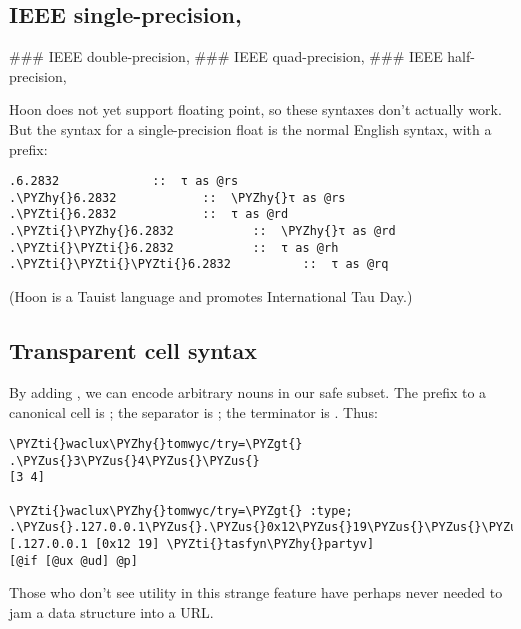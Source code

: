 \subsection{IEEE single-precision, }

\#\#\# IEEE double-precision, 
\#\#\# IEEE quad-precision, 
\#\#\# IEEE half-precision, 

Hoon does not yet support floating point, so these syntaxes
don't actually work.  But the syntax for a single-precision
float is the normal English syntax, with a  prefix:

\begin{framed_shaded}
\begin{Verbatim}[fontsize=\relsize{-2.5},fontseries=b,commandchars=\\\{\}]
.6.2832             ::  τ as @rs
.\PYZhy{}6.2832            ::  \PYZhy{}τ as @rs
.\PYZti{}6.2832            ::  τ as @rd
.\PYZti{}\PYZhy{}6.2832           ::  \PYZhy{}τ as @rd
.\PYZti{}\PYZti{}6.2832           ::  τ as @rh
.\PYZti{}\PYZti{}\PYZti{}6.2832          ::  τ as @rq
\end{Verbatim}
\end{framed_shaded}
(Hoon is a Tauist language and promotes International Tau Day.)

\subsection{Transparent cell syntax}

By adding \kode{\_}, we can encode arbitrary nouns in our safe subset.
The prefix to a canonical cell is ; the separator is \kode{\_};
the terminator is \kode{\_\_}.  Thus:

\begin{framed_shaded}
\begin{Verbatim}[fontsize=\relsize{-2.5},fontseries=b,commandchars=\\\{\}]
\PYZti{}waclux\PYZhy{}tomwyc/try=\PYZgt{} .\PYZus{}3\PYZus{}4\PYZus{}\PYZus{}
[3 4]

\PYZti{}waclux\PYZhy{}tomwyc/try=\PYZgt{} :type; .\PYZus{}.127.0.0.1\PYZus{}.\PYZus{}0x12\PYZus{}19\PYZus{}\PYZus{}\PYZus{}\PYZti{}tasfyn\PYZhy{}partyv\PYZus{}\PYZus{}
[.127.0.0.1 [0x12 19] \PYZti{}tasfyn\PYZhy{}partyv]
[@if [@ux @ud] @p]
\end{Verbatim}
\end{framed_shaded}
Those who don't see utility in this strange feature have
perhaps never needed to jam a data structure into a URL.

